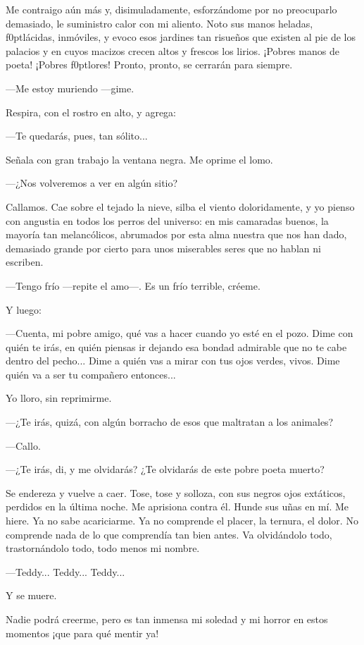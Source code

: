 \documentclass[14pt,a5paper,oneside,final]{extbook}
\begin{document}
Me contraigo aún más y, disimuladamente, esforzándome por no preocuparlo demasiado, le suministro calor con mi aliento. Noto sus manos heladas, f\kern0ptlácidas, inmóviles, y evoco esos jardines tan risueños que existen al pie de los palacios y en cuyos macizos crecen altos y frescos los lirios. ¡Pobres manos de poeta! ¡Pobres f\kern0ptlores! Pronto, pronto, se cerrarán para siempre.

---Me estoy muriendo ---gime.

Respira, con el rostro en alto, y agrega:

---Te quedarás, pues, tan sólito...

Señala con gran trabajo la ventana negra. Me oprime el lomo.

---¿Nos volveremos a ver en algún sitio?

Callamos. Cae sobre el tejado la nieve, silba el viento doloridamente, y yo pienso con angustia en todos los perros del universo: en mis camaradas buenos, la mayoría tan melancólicos, abrumados por esta alma nuestra que nos han dado, demasiado grande por cierto para unos miserables seres que no hablan ni escriben.

---Tengo frío ---repite el amo---. Es un frío terrible, créeme.

Y luego:

---Cuenta, mi pobre amigo, qué vas a hacer cuando yo esté en el pozo. Dime con quién te irás, en quién piensas ir dejando esa bondad admirable que no te cabe dentro del pecho... Dime a quién vas a mirar con tus ojos verdes, vivos. Dime quién va a ser tu compañero entonces...

Yo lloro, sin reprimirme.

---¿Te irás, quizá, con algún borracho de esos que maltratan a los animales?

---Callo.

---¿Te irás, di, y me olvidarás? ¿Te olvidarás de este pobre poeta muerto?

Se endereza y vuelve a caer. Tose, tose y solloza, con sus negros ojos extáticos, perdidos en la última noche. Me aprisiona contra él. Hunde sus uñas en mí. Me hiere. Ya no sabe acariciarme. Ya no comprende el placer, la ternura, el dolor. No comprende nada de lo que comprendía tan bien antes. Va olvidándolo todo, trastornándolo todo, todo menos mi nombre.

---Teddy... Teddy... Teddy...

Y se muere.

Nadie podrá creerme, pero es tan inmensa mi soledad y mi horror en estos momentos ¡que para qué mentir ya!
\end{document}
